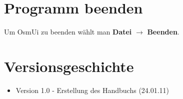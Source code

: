 \documentclass[a4paper,10pt]{scrartcl}
\begin{document}
\section{Programm beenden}
Um OsmUi zu beenden wählt man \textbf{Datei} $\rightarrow$ \textbf{Beenden}.

\section{Versionsgeschichte}
\begin{itemize}
\item Version 1.0 - Erstellung des Handbuchs (24.01.11)
\end{itemize}
\end{document}
